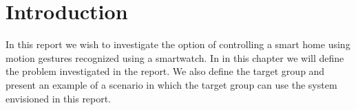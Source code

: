 \chapter{Introduction}
\label{chap:introduction}

In this report we wish to investigate the option of controlling a smart home using motion gestures recognized using a smartwatch. In in this chapter we will define the problem investigated in the report. We also define the target group and present an example of a scenario in which the target group can use the system envisioned in this report.







% 

